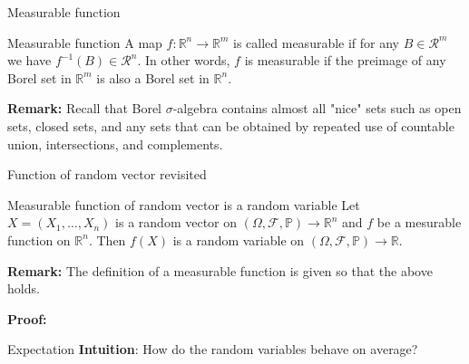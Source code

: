 \documentclass [aspectratio=169]{beamer}
\begin{document}
\begin{frame}{Measurable function}

\begin{block}{Measurable function}
A map $f: \mathbb{R}^n \to \mathbb{R}^m$ is called measurable if for any $B \in \mathcal{R}^m$ we have $f^{-1}(B) \in \mathcal{R}^n$. In other words, $f$ is measurable if the preimage of any Borel set in $\mathbb{R}^m$ is also a Borel set in $\mathbb{R}^n$.
\end{block}

\textbf{Remark:} Recall that Borel $\sigma$-algebra contains almost all "nice" sets such as open sets, closed sets, and any sets that can be obtained by repeated use of countable union, intersections, and complements.

\end{frame}

\begin{frame}{Function of random vector revisited}

\begin{block}{Measurable function of random vector is a random variable}
Let $X = (X_1, \ldots, X_n)$ is a random vector on $(\Omega, \mathcal F, \mathbb P) \to \mathbb R^n$ and $f$ be a mesurable function on $\mathbb R^n$. Then $f(X)$ is a random variable on $(\Omega, \mathcal F, \mathbb P) \to \mathbb R$.
\end{block}

\textbf{Remark:} The definition of a measurable function is given so that the above holds.

\vspace{1mm}

\textbf{Proof:}

\vspace{1.2in}

\end{frame}

\begin{frame}{Expectation}
\textbf{Intuition}: How do the random variables behave on average?\\
\end{frame}
\end{document}
